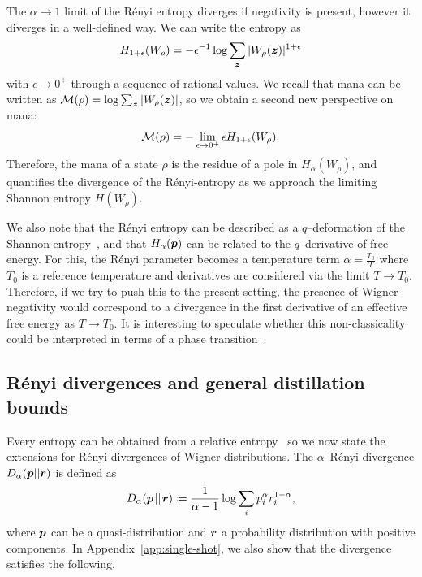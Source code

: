 \documentclass[pra,
aps,
twocolumn,
superscriptaddress,
groupedaddress,
nofootinbib,
reprint
]{revtex4-1}
\begin{document}
The $\alpha \rightarrow 1$ limit of the R\'{e}nyi entropy diverges if negativity is present, however it diverges in a well-defined way. We can write the entropy as 
\begin{equation}
	H_{1+\epsilon}(W_\rho) = -\epsilon^{-1} \log \sum_{\bm{z}} |W_\rho (\bm{z})|^{1+\epsilon}
\end{equation} 
with $\epsilon \rightarrow 0^+$ through a sequence of rational values. We recall that mana can be written as ${\mathcal M}(\rho) = \log \sum_{\bm{z}} |W_\rho(\bm{z})|$, so we obtain a second new perspective on mana:
\begin{equation}\label{eq:mana-divergence}
{\mathcal M}(\rho) = -\lim_{\epsilon \rightarrow 0^+} \epsilon H_{1+\epsilon}(W_\rho).
\end{equation}
Therefore, the mana of a state $\rho$ is the residue of a pole in $H_\alpha(W_\rho)$, and quantifies the divergence of the R\'{e}nyi-entropy as we approach the limiting Shannon entropy $H(W_\rho)$. 

We also note that the R\'{e}nyi entropy can be described as a $q$--deformation of the Shannon entropy~\cite{baez2011renyi}, and that $H_\alpha(\boldsymbol{p})$ can be related to the $q$--derivative of free energy.  For this, the R\'{e}nyi parameter becomes a temperature term $\alpha = \frac{T_0}{T}$ where $T_0$ is a reference temperature and derivatives are considered via the limit $T \rightarrow T_0$. Therefore, if we try to push this to the present setting, the presence of Wigner negativity would correspond to a divergence in the first derivative of an effective free energy as $T \rightarrow T_0$. It is interesting to speculate whether this non-classicality could be interpreted in terms of a phase transition~\cite{domb2000phase}.

\subsection{R\'{e}nyi divergences and general distillation bounds}
Every entropy can be obtained from a relative entropy~\cite{Gour_2020} so we now state the extensions for R\'{e}nyi divergences of Wigner distributions.
The $\alpha$--R\'{e}nyi divergence $D_\alpha(\boldsymbol{p}||\boldsymbol{r})$ is defined as
\begin{equation}
	D_\alpha(\boldsymbol{p} \hspace{1pt}||\hspace{1pt} \boldsymbol{r}) \coloneqq \frac{1}{\alpha-1} \log \sum_i p_i^\alpha r_i^{1-\alpha},
\end{equation}
where $\boldsymbol{p}$ can be a quasi-distribution and $\boldsymbol{r}$ a probability distribution with positive components. In Appendix~\ref{app:single-shot}, we also show that the divergence satisfies the following.
\end{document}
